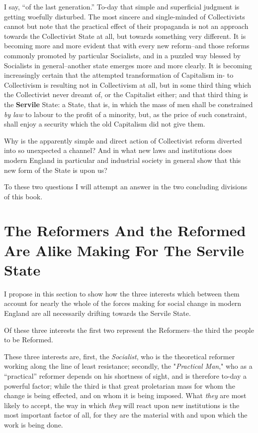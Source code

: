 \documentclass{book}
\newcommand\mdstrong[1]{\textbf{#1}}
\begin{document}
I say, “of the last generation.” To-day that simple and superficial judgment is getting woefully disturbed. The most sincere and single-minded of Collectivists cannot but note that the practical effect of their propaganda is not an approach towards the Collectivist State at all, but towards something very different. It is becoming more and more evident that with every new reform–and those reforms commonly promoted by particular Socialists, and in a puzzled way blessed by Socialists in general–another state emerges more and more clearly. It is becoming increasingly certain that the attempted transformation of Capitalism in- to Collectivism is resulting not in Collectivism at all, but in some third thing which the Collectivist never dreamt of, or the Capitalist either; and that third thing is the \mdstrong{Servile} State: a State, that is, in which the mass of men shall be constrained \emph{by law} to labour to the profit of a minority, but, as the price of such constraint, shall enjoy a security which the old Capitalism did not give them.

Why is the apparently simple and direct action of Collectivist reform diverted into so unexpected a channel? And in what new laws and institutions does modern England in particular and industrial society in general show that this new form of the State is upon us?

To these two questions I will attempt an answer in the two concluding divisions of this book.

\chapter{The Reformers And the Reformed Are Alike Making For The Servile State}
\label{chapter-8}
I propose in this section to show how the three interests which between them account for nearly the whole of the forces making for social change in modern England are all necessarily drifting towards the Servile State.

Of these three interests the first two represent the Reformers–the third the people to be Reformed.

These three interests are, first, the \emph{Socialist}, who is the theoretical reformer working along the line of least resistance; secondly, the "\emph{Practical Man}," who as a “practical” reformer depends on his shortness of sight, and is therefore to-day a powerful factor; while the third is that great proletarian mass for whom the change is being effected, and on whom it is being imposed. What \emph{they} are most likely to accept, the way in which \emph{they} will react upon new institutions is the most important factor of all, for they are the material with and upon which the work is being done.
\end{document}

